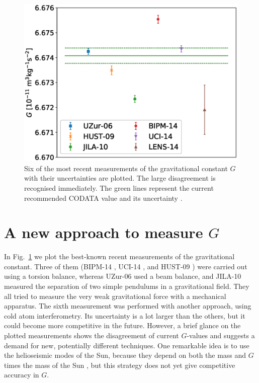 \documentclass[]{rsos}
\begin{document}
\begin{figure}
	\centering
	\includegraphics[width=\textwidth]{img/plotGmeas}
	\caption{Six of the most recent measurements of the gravitational constant $G$ with their uncertainties are plotted. The large disagreement is recognised immediately. The green lines represent the current recommended CODATA value and its uncertainty \citep{CODATA17}.}
	\label{fig:Gmeasurements}
\end{figure}

\section{A new approach to measure $G$}
In Fig.~\ref{fig:Gmeasurements} we plot the best-known recent
measurements of the gravitational constant. Three of them
(BIPM-14 \citep{Quinn14}, UCI-14 \citep{Newman14}, and
HUST-09 \citep{Luo09}) were carried out using a torsion balance, whereas
UZur-06 \citep{Schlamminger06} used a beam balance, and
JILA-10 \citep{Parks10} measured the separation of two simple pendulums
in a gravitational field. They all tried to measure the very weak
gravitational force with a mechanical apparatus. The sixth measurement
\citep[LENS-14][]{Rosi14} was performed with another approach, using cold
atom interferometry. Its uncertainty is a lot larger than the others,
but it could become more competitive in the future. However, a brief
glance on the plotted measurements shows the disagreement of current
$G$-values and suggests a demand for new, potentially different
techniques.  One remarkable idea is to use the helioseismic modes of
the Sun, because they depend on both the mass and $G$ times the mass
of the Sun \citep{Ch-Dalsgaard05}, but this strategy does not yet give
competitive accuracy in $G$.
\end{document}
